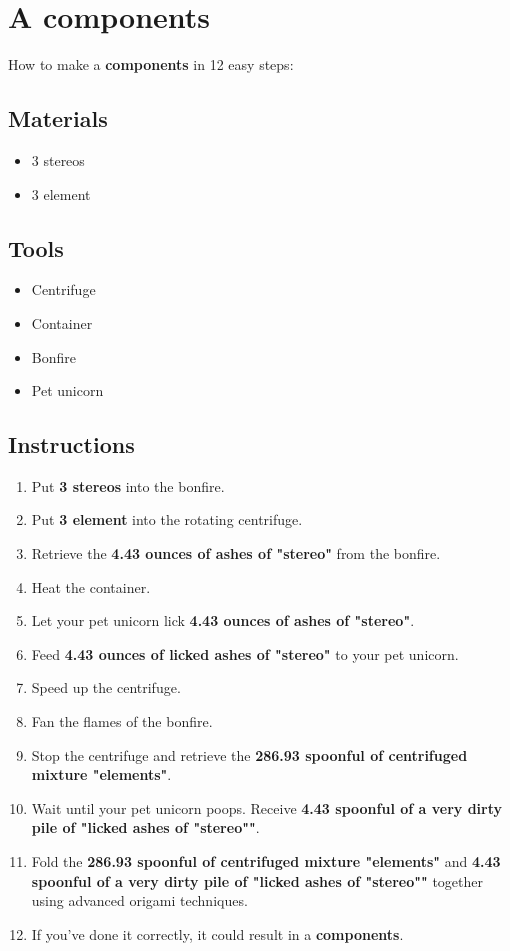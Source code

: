 \documentclass{article}
\begin{document}
\section{A components}How to make a \textbf{components} in 12 easy steps:

\subsection{Materials}\begin{itemize}
\item 
3 stereos
\item 
3 element
\end{itemize}
\subsection{Tools}\begin{itemize}
\item 
Centrifuge
\item 
Container
\item 
Bonfire
\item 
Pet unicorn
\end{itemize}
\subsection{Instructions}\begin{enumerate}
\item 
Put \textbf{3 stereos} into the bonfire.
\item 
Put \textbf{3 element} into the rotating centrifuge.
\item 
Retrieve the \textbf{4.43 ounces of ashes of "stereo"} from the bonfire.
\item 
Heat the container.
\item 
Let your pet unicorn lick \textbf{4.43 ounces of ashes of "stereo"}.
\item 
Feed \textbf{4.43 ounces of licked ashes of "stereo"} to your pet unicorn.
\item 
Speed up the centrifuge.
\item 
Fan the flames of the bonfire.
\item 
Stop the centrifuge and retrieve the \textbf{286.93 spoonful of centrifuged mixture "elements"}.
\item 
Wait until your pet unicorn poops. Receive \textbf{4.43 spoonful of a very dirty pile of "licked ashes of "stereo""}.
\item 
Fold the \textbf{286.93 spoonful of centrifuged mixture "elements"} and \textbf{4.43 spoonful of a very dirty pile of "licked ashes of "stereo""} together using advanced origami techniques.
\item 
If you've done it correctly, it could result in a \textbf{components}.
\end{enumerate}
\newpage
\end{document}
